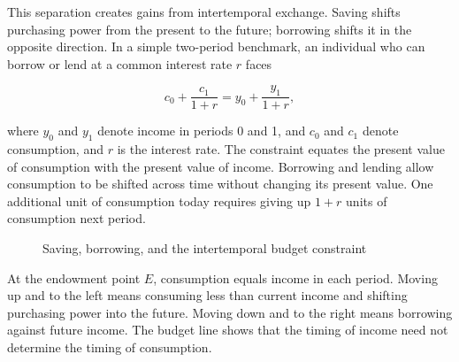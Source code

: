 This separation creates gains from intertemporal exchange. Saving shifts purchasing power from the present to the future; borrowing shifts it in the opposite direction. In a simple two-period benchmark, an individual who can borrow or lend at a common interest rate $r$ faces

\begin{equation}
c_0+\frac{c_1}{1+r}=y_0+\frac{y_1}{1+r},
\label{eq:ch1_intertemporal_budget}
\end{equation}

where $y_0$ and $y_1$ denote income in periods 0 and 1, and $c_0$ and $c_1$ denote consumption, and $r$ is the interest rate. The constraint equates the present value of consumption with the present value of income. Borrowing and lending allow consumption to be shifted across time without changing its present value. One additional unit of consumption today requires giving up $1+r$ units of consumption next period.

\begin{figure}[H]
\centering
{}
\caption{Saving, borrowing, and the intertemporal budget constraint}
\label{fig:ch1-intertemporal-budget}
\end{figure}

At the endowment point $E$, consumption equals income in each period. Moving up and to the left means consuming less than current income and shifting purchasing power into the future. Moving down and to the right means borrowing against future income. The budget line shows that the timing of income need not determine the timing of consumption.

